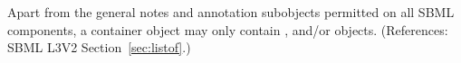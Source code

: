 Apart from the general notes and annotation subobjects permitted on all
SBML components, a \ListOfRules container object may only contain
\AssignmentRule, \AlgebraicRule and/or \RateRule objects.  (References:
SBML L3V2 Section~\ref{sec:listof}.)
